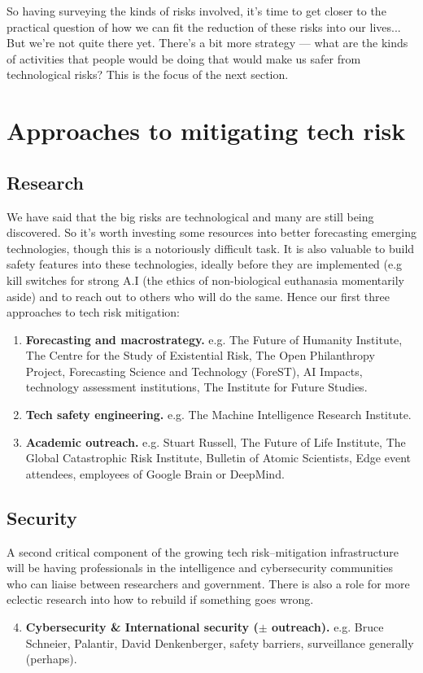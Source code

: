 \documentclass[12pt]{article}
\begin{document}
So having surveying the kinds of risks involved, it's time to get closer to the practical question of how we can 
fit the reduction of these risks into our lives... But we're not quite there yet. There's a bit more strategy --- 
what are the kinds of activities that people would be doing that would make us safer from technological risks? 
This is the focus of the next section.

\section{Approaches to mitigating tech risk}
\subsection*{Research}
We have said that the big risks are technological and many are still being discovered. So it's worth
investing some resources into better forecasting emerging technologies, though this 
is a notoriously difficult task. It is also valuable to build safety features into these technologies, 
ideally before they are implemented (e.g kill switches for strong A.I (the ethics of non-biological euthanasia momentarily aside) and to reach out to others who will do the same. Hence our first 
three approaches to tech risk mitigation:

\begin{enumerate}[label=\textbf{\arabic*})]
    \item {\bfseries Forecasting and macrostrategy.} e.g. The Future of Humanity Institute, The Centre 
        for the Study of Existential Risk, The Open Philanthropy Project, Forecasting Science and 
        Technology (ForeST), AI Impacts, technology assessment institutions, The Institute for Future Studies.
    \item {\bfseries Tech safety engineering.} e.g. The Machine Intelligence Research Institute.
\item {\bfseries Academic outreach.} e.g. Stuart Russell, The Future of Life Institute, The Global Catastrophic 
    Risk Institute, Bulletin of Atomic Scientists, Edge event attendees, employees of Google Brain or DeepMind.
\end{enumerate}

\subsection*{Security}
A second critical component of the growing tech risk--mitigation infrastructure will be having professionals in the intelligence and cybersecurity communities who can liaise between researchers and government. There is also a role for more eclectic research into how to rebuild if something goes wrong.
\begin{enumerate}[label=\textbf{\arabic*})]
        \setcounter{enumi}{3}
    \item {\bfseries Cybersecurity \& International security (\(\mathbf{\pm}\) outreach).} e.g. Bruce Schneier, Palantir, David Denkenberger, safety barriers, surveillance generally (perhaps).
\end{enumerate}
\end{document}
